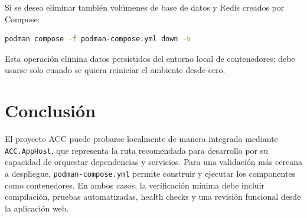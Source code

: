 \documentclass[12pt,letterpaper]{article}
\begin{document}
Si se desea eliminar tambi\'en vol\'umenes de base de datos y Redis creados por Compose:

\begin{lstlisting}[language=bash,caption={Eliminar servicios y vol\'umenes de Compose.}]
podman compose -f podman-compose.yml down -v
\end{lstlisting}

Esta operaci\'on elimina datos persistidos del entorno local de contenedores; debe usarse solo cuando se quiera reiniciar el ambiente desde cero.

\section{Conclusi\'on}

El proyecto ACC puede probarse localmente de manera integrada mediante \texttt{ACC.AppHost}, que representa la ruta recomendada para desarrollo por su capacidad de orquestar dependencias y servicios. Para una validaci\'on m\'as cercana a despliegue, \texttt{podman-compose.yml} permite construir y ejecutar los componentes como contenedores. En ambos casos, la verificaci\'on m\'inima debe incluir compilaci\'on, pruebas automatizadas, health checks y una revisi\'on funcional desde la aplicaci\'on web.
\end{document}

